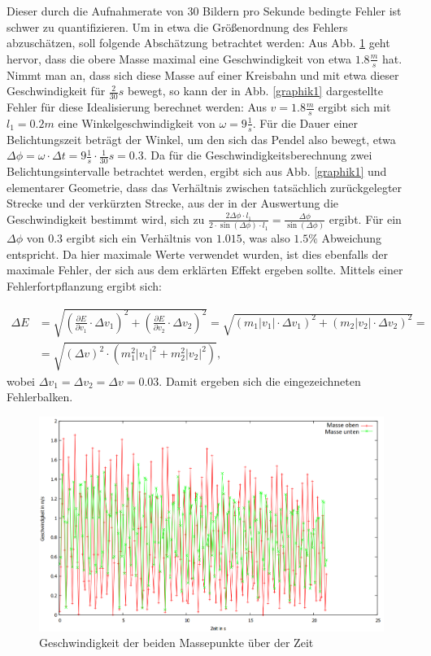 Dieser durch die Aufnahmerate von 30 Bildern pro Sekunde bedingte Fehler ist schwer zu quantifizieren. Um in etwa die Größenordnung 
des Fehlers abzuschätzen, soll folgende Abschätzung betrachtet werden: 
Aus Abb. \ref{v_ueber_t} geht hervor, dass die obere Masse maximal eine Geschwindigkeit von etwa $1.8 \frac{m}{s} $ hat. Nimmt man an, 
dass sich diese Masse auf einer Kreisbahn und mit etwa dieser Geschwindigkeit für $\frac{2}{30} s$ bewegt, so kann der in 
Abb. \ref{graphik1} dargestellte Fehler für diese Idealisierung berechnet werden: 
Aus $ v = 1.8 \frac{m}{s} $ ergibt sich mit $ l_1 = 0.2 m$ eine Winkelgeschwindigkeit von $ \omega = 9 \frac{1}{s} $. Für die Dauer
einer Belichtungszeit beträgt der Winkel, um den sich das Pendel also bewegt, etwa $ \Delta \phi = \omega \cdot \Delta t = 9 \frac{1}{s} \cdot \frac{1}{30} s = 0.3$. 
Da für die Geschwindigkeitsberechnung zwei Belichtungsintervalle betrachtet werden, ergibt sich aus Abb. \ref{graphik1} und elementarer 
Geometrie, dass das Verhältnis zwischen tatsächlich zurückgelegter Strecke und der verkürzten Strecke, aus der in der Auswertung die Geschwindigkeit bestimmt 
wird, sich zu $ \frac{2 \Delta \phi \cdot l_1}{2 \cdot \sin(\Delta \phi) \cdot l_1} = \frac{\Delta \phi}{\sin(\Delta \phi)} $
ergibt. Für ein $\Delta \phi $ von 0.3 ergibt sich ein Verhältnis von $1.015$, was also $1.5 \% $ Abweichung entspricht. 
Da hier maximale Werte verwendet wurden, ist dies ebenfalls der maximale Fehler, der sich aus dem erklärten Effekt ergeben sollte. 
Mittels einer Fehlerfortpflanzung ergibt sich: 

\begin{align}
\Delta E &= \sqrt{(\frac{\partial E}{\partial v_1} \cdot \Delta v_1)^2 + (\frac{\partial E}{\partial v_2} \cdot \Delta v_2)^2} = \sqrt{(m_1 |v_1| \cdot \Delta v_1)^2 + (m_2 |v_2| \cdot \Delta v_2)^2}= \nonumber \\ &= \sqrt{(\Delta v)^2 \cdot (m_1^2 |v_1|^2 + m_2^2 |v_2|^2)}, 
\end{align}
wobei $ \Delta v_1 = \Delta v_2 = \Delta v  = 0.03$. 
Damit ergeben sich die eingezeichneten Fehlerbalken. 


\begin{figure}
        \includegraphics[width=.9\textwidth]{images/v_ueber_t_neu.png}
\caption{Geschwindigkeit der beiden Massepunkte über der Zeit}
\label{v_ueber_t}
\end{figure}


